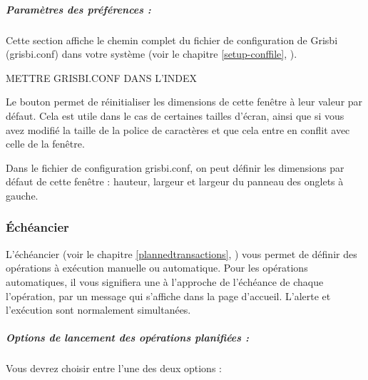 


\newpage





\subparagraph{Paramètres des préférences :\label{setup-general-various-general-preferences}}

Cette section affiche le chemin complet du fichier de configuration de Grisbi (grisbi.conf) dans votre système (voir le chapitre \vref{setup-conffile}, ).

METTRE GRISBI.CONF DANS L'INDEX

Le bouton  permet de réinitialiser les dimensions de cette fenêtre à leur valeur par défaut. Cela est utile dans le cas de certaines tailles d'écran, ainsi que si vous avez modifié la taille de la police de caractères et que cela entre en conflit avec celle de la fenêtre.

Dans le fichier de configuration grisbi.conf, on peut définir les dimensions par défaut de cette fenêtre : hauteur, largeur et largeur du panneau des onglets à gauche.


\subsubsection{Échéancier\label{setup-general-various-planned}}

L'échéancier (voir le chapitre \vref{plannedtransactions}, ) vous permet de définir des opérations à exécution manuelle ou automatique. Pour les opérations automatiques, il vous signifiera une  à l'approche de l'échéance de chaque l'opération, par un message qui s'affiche dans la page d'accueil. L'alerte et l'exécution sont normalement simultanées.

\subparagraph{Options de lancement des opérations planifiées :\label{setup-general-various-planned-options}}

Vous devrez choisir entre l'une des deux options :

